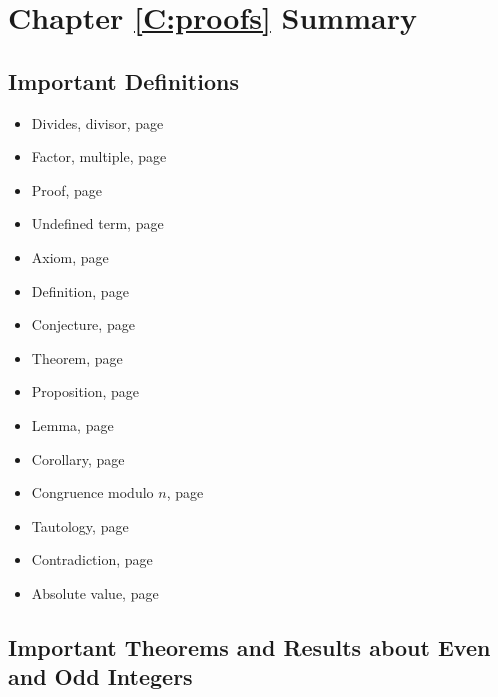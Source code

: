 \section{Chapter \ref{C:proofs} Summary}

\subsection*{Important Definitions}
\begin{multicols}{2}
\begin{itemize}
\item Divides, divisor, page~\pageref*{divides}
\item Factor, multiple, page~\pageref*{divides}
\item Proof, page~\pageref*{proof}
\item Undefined term, page~\pageref*{undefined}
\item Axiom, page~\pageref*{axiom}
\item Definition, page~\pageref*{definition}
\item Conjecture, page~\pageref*{conjecture}
\item Theorem, page~\pageref*{theorem}
\item Proposition, page~\pageref*{proposition}
\item Lemma, page~\pageref*{lemma}
\item Corollary, page~\pageref*{corollary}
\item Congruence modulo $n$, page~\pageref*{congruence}
\item Tautology, page~\pageref*{D:tautology}
\item Contradiction, page~\pageref*{D:tautology}
\item Absolute value, page~\pageref*{D:absvalue}
\end{itemize}
\end{multicols}
\hbreak



\subsection*{Important Theorems and Results about Even and Odd Integers} \label{SS:evenodd}
{}%
%

